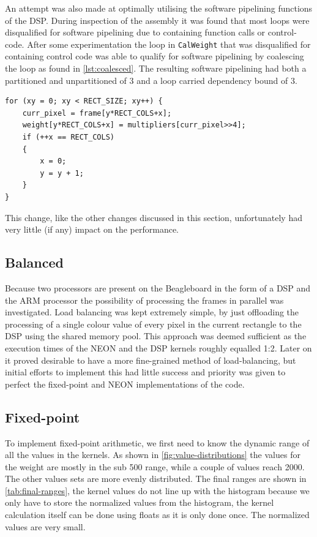\documentclass[final]{article}
\begin{document}
An attempt was also made at optimally utilising the software pipelining functions of the DSP.
During inspection of the assembly it was found that most loops were disqualified for software pipelining due to containing function calls or control-code.
After some experimentation the loop in \texttt{CalWeight} that was disqualified for containing control code was able to qualify for software pipelining by coalescing the loop as found in \cref{lst:coalesced}.
The resulting software pipelining had both a partitioned and unpartitioned of 3 and a loop carried dependency bound of 3.

\begin{lstlisting}[style=c, caption=Coalesced loop for weight calculation, label=lst:coalesced]
for (xy = 0; xy < RECT_SIZE; xy++) {
    curr_pixel = frame[y*RECT_COLS+x];
    weight[y*RECT_COLS+x] = multipliers[curr_pixel>>4];
    if (++x == RECT_COLS)
    {
        x = 0;
        y = y + 1;
    }
}
\end{lstlisting}

This change, like the other changes discussed in this section, unfortunately had very little (if any) impact on the performance.


\subsection{Balanced}
Because two processors are present on the Beagleboard in the form of a DSP and the ARM processor the possibility of processing the frames in parallel was investigated.
Load balancing was kept extremely simple, by just offloading the processing of a single colour value of every pixel in the current rectangle to the DSP using the shared memory pool.
This approach was deemed sufficient as the execution times of the NEON and the DSP kernels roughly equalled 1:2.
Later on it proved desirable to have a more fine-grained method of load-balancing, but initial efforts to implement this had little success and priority was given to perfect the fixed-point and NEON implementations of the code.


\subsection{Fixed-point}
To implement fixed-point arithmetic, we first need to know the dynamic range of all the values in the kernels.
As shown in \cref{fig:value-distributions} the values for the weight are mostly in the sub \num{500} range, while a couple of values reach \num{2000}.
The other values sets are more evenly distributed.
The final ranges are shown in \cref{tab:final-ranges}, the kernel values do not line up with the histogram because we only have to store the normalized values from the histogram, the kernel calculation itself can be done using floats as it is only done once.
The normalized values are very small.
\end{document}
